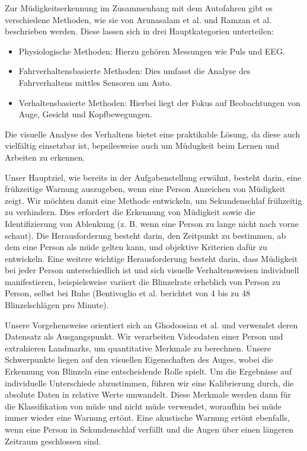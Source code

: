 Zur Müdigkeitserkennung im Zusammenhang mit dem Autofahren gibt es verschiedene Methoden, wie sie von Arunasalam et al. \cite{AR20} und Ramzan et al. \cite{RA19} beschrieben werden. Diese lassen sich in drei Hauptkategorien unterteilen:

\begin{itemize}
\item Physiologische Methoden: Hierzu gehören Messungen wie Puls und EEG.
\item Fahrverhaltensbasierte Methoden: Dies umfasst die Analyse des Fahrverhaltens mittles Sensoren am Auto.
\item Verhaltensbasierte Methoden: Hierbei liegt der Fokus auf Beobachtungen von Auge, Gesicht und Kopfbewegungen.
\end{itemize}

Die visuelle Analyse des Verhaltens bietet eine praktikable Lösung, da diese auch vielfältig einsetzbar ist, bepsilesweise auch um Müdugkeit beim Lernen und Arbeiten zu erkennen.

Unser Hauptziel, wie bereits in der Aufgabenstellung erwähnt, besteht darin, eine frühzeitige Warnung auszugeben, wenn eine Person Anzeichen von Müdigkeit zeigt. Wir möchten damit eine Methode entwickeln, um Sekundenschlaf frühzeitig zu verhindern. Dies erfordert die Erkennung von Müdigkeit sowie die Identifizierung von Ablenkung (z. B. wenn eine Person zu lange nicht nach vorne schaut). Die Herausforderung besteht darin, den Zeitpunkt zu bestimmen, ab dem eine Person als müde gelten kann, und objektive Kriterien dafür zu entwickeln. Eine weitere wichtige Herausforderung besteht darin, dass Müdigkeit bei jeder Person unterschiedlich ist und sich visuelle Verhaltensweisen individuell manifestieren, beispielsweise variiert die Blinzelrate erheblich von Person zu Person, selbst bei Ruhe (Bentivoglio et al. \cite{BE97} berichtet von 4 bis zu 48 Blinzelschlägen pro Minute).

Unsere Vorgehensweise orientiert sich an Ghodoosian et al. \cite{GH19} und verwendet deren Datensatz als Ausgangspunkt. Wir verarbeiten Videodaten einer Person und extrahieren Landmarks, um quantitative Merkmale zu berechnen. Unsere Schwerpunkte liegen auf den visuellen Eigenschaften des Auges, wobei die Erkennung von Blinzeln eine entscheidende Rolle spielt. Um die Ergebnisse auf individuelle Unterschiede abzustimmen, führen wir eine Kalibrierung durch, die absolute Daten in relative Werte umwandelt. Diese Merkmale werden dann für die Klassifikation von \glqq müde\grqq{} und \glqq nicht müde\grqq{} verwendet, woraufhin bei \glqq müde\grqq{} immer wieder eine Warnung ertönt. Eine akustische Warnung ertönt ebenfalls, wenn eine Person in Sekundenschlaf verfällt und die Augen über einen längeren Zeitraum geschlossen sind.

